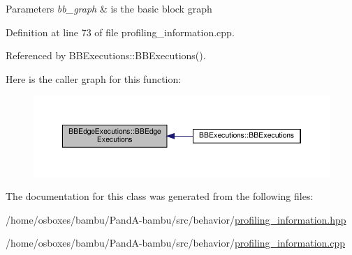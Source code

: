 \begin{DoxyParams}{Parameters}
{\em bb\+\_\+graph} & is the basic block graph \\
\hline
\end{DoxyParams}


Definition at line 73 of file profiling\+\_\+information.\+cpp.



Referenced by B\+B\+Executions\+::\+B\+B\+Executions().

Here is the caller graph for this function\+:
\nopagebreak
\begin{figure}[H]
\begin{center}
\leavevmode
\includegraphics[width=350pt]{d2/d82/classBBEdgeExecutions_a4ba68e03196892ecb0d1917ee9c22cc7_icgraph}
\end{center}
\end{figure}


The documentation for this class was generated from the following files\+:\begin{DoxyCompactItemize}
\item 
/home/osboxes/bambu/\+Pand\+A-\/bambu/src/behavior/\hyperlink{profiling__information_8hpp}{profiling\+\_\+information.\+hpp}\item 
/home/osboxes/bambu/\+Pand\+A-\/bambu/src/behavior/\hyperlink{profiling__information_8cpp}{profiling\+\_\+information.\+cpp}\end{DoxyCompactItemize}
